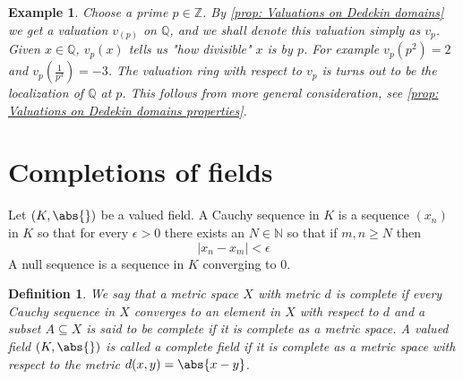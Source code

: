 \documentclass{article}
\newtheorem{definition}{Definition}[section]
\newtheorem{example}{Example}[section]
\newcommand{\mbb}[1]{\mathbb{#1}}
\numberwithin{equation}{section}
\begin{document}
\begin{example}\label{ex: Almost the p-adic numbers}
    Choose a prime $p \in \mbb Z$. By \cref{prop: Valuations on Dedekin domains} we get a valuation $v_{(p)}$ on $\mbb Q$, and we shall denote this valuation simply as $v_p$. Given $x \in \mbb Q$, $v_p(x)$ tells us "how divisible" $x$ is by $p$. For example $v_p(p^2) = 2$ and $v_p(\frac{1}{p^3}) = -3$. The valuation ring with respect to $v_p$ is turns out to be the localization of $\mbb Q$ at $p$. This follows from more general consideration, see \cref{prop: Valuations on Dedekin domains properties}.
\end{example}

\section{Completions of fields}


Let $(K, \abs{})$ be a valued field. A Cauchy sequence in $K$ is a sequence $(x_n)$ in $K$ so that for every $\epsilon > 0$ there exists an $N \in \mbb N$ so that if $m,n \geq N$ then
$$|x_n - x_m| < \epsilon$$
A null sequence is a sequence in $K$ converging to 0.


\begin{definition}
    We say that a metric space $X$ with metric $d$ is complete if every Cauchy sequence in $X$ converges to an element in $X$ with respect to $d$ and a subset $A \subseteq X$ is said to be complete if it is complete as a metric space. A valued field $(K, \abs{})$ is called a complete field if it is complete as a metric space with respect to the metric $d(x,y) = \abs{x - y}$.
\end{definition}
\end{document}
